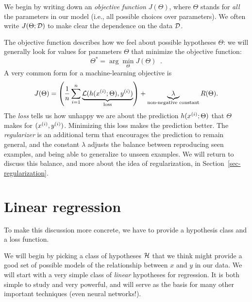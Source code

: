 We begin by writing down an \emph{objective function} $J(\Theta)$,
where $\Theta$ stands for {\em all} the parameters in our model (i.e., all possible choices over parameters).
We often write $J(\Theta; {\cal D})$ to make clear the dependence on
the data ${\cal D}$.

The objective function describes how we feel about
possible hypotheses $\Theta$: we will generally look for values for
parameters $\Theta$ that minimize the objective function:
\[ \Theta^* = \arg\min_{\Theta} J(\Theta)\;\;. \]
A very common form for a machine-learning objective is
%
\begin{equation}
  J(\Theta) = \left(\frac{1}{n} \sum_{i=1}^n
  \underbrace{\mathcal{L}(h(x^{(i)}; \Theta),
    y^{(i)})}_\text{loss}\right) + \underbrace{\lambda}
  _\text{non-negative constant} {R(\Theta)}.
  \label{eq:ml_objective_loss}
\end{equation}
%
The \emph{loss} tells us how unhappy we are about the prediction
$h(x^{(i)}; \Theta)$ that $\Theta$ makes for $(x^{(i)},
  y^{(i)})$.  Minimizing this loss makes the prediction better.  The
\emph{regularizer} is an additional term that encourages the
prediction to remain general, and the constant $\lambda$ adjusts the
balance between reproducing seen examples, and being able to
generalize to unseen examples.  We will return to discuss this
balance, and more about the idea of regularization, in
Section~\ref{sec-regularization}.

\section{Linear regression}

To make this discussion more concrete, we have to provide a hypothesis
class and a loss function.

We will begin by picking a class of hypotheses ${\cal H}$ that we think
might provide a good set of possible models of the relationship
between $x$ and $y$ in our data.  We will start with a very simple
class of {\em linear} hypotheses for regression.  It is both simple to
study and very powerful, and will serve as the basis for many other
important techniques (even neural networks!).

